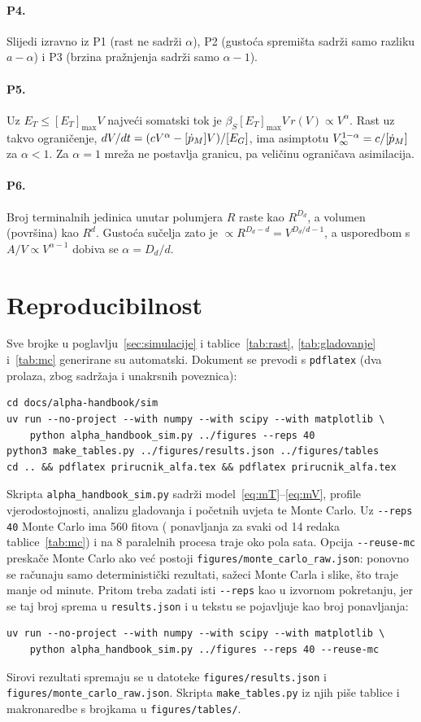 \paragraph{P4.} Slijedi izravno iz P1 (rast ne sadrži $\alpha$), P2 (gustoća spremišta sadrži samo razliku $a-\alpha$) i P3 (brzina pražnjenja sadrži samo $\alpha-1$).

\paragraph{P5.} Uz $E_T\le[E_T]_{\max}V$ najveći somatski tok je $\beta_S[E_T]_{\max}V\,r(V)\propto V^{\alpha}$. Rast uz takvo ograničenje, $dV/dt=(cV^{\alpha}-[\dot p_M] V)/[E_G]$, ima asimptotu $V_\infty^{1-\alpha}=c/[\dot p_M]$ za $\alpha<1$. Za $\alpha=1$ mreža ne postavlja granicu, pa veličinu ograničava asimilacija.

\paragraph{P6.} Broj terminalnih jedinica unutar polumjera $R$ raste kao $R^{D_d}$, a volumen (površina) kao $R^{d}$. Gustoća sučelja zato je $\propto R^{D_d-d}=V^{D_d/d-1}$, a usporedbom s $A/V\propto V^{\alpha-1}$ dobiva se $\alpha=D_d/d$.

\section{Reproducibilnost}\label{app:kod}

Sve brojke u poglavlju~\ref{sec:simulacije} i tablice~\ref{tab:rast}, \ref{tab:gladovanje} i~\ref{tab:mc} generirane su automatski. Dokument se prevodi s \texttt{pdflatex} (dva prolaza, zbog sadržaja i unakrsnih poveznica):
\begin{verbatim}
cd docs/alpha-handbook/sim
uv run --no-project --with numpy --with scipy --with matplotlib \
    python alpha_handbook_sim.py ../figures --reps 40
python3 make_tables.py ../figures/results.json ../figures/tables
cd .. && pdflatex prirucnik_alfa.tex && pdflatex prirucnik_alfa.tex
\end{verbatim}
Skripta \texttt{alpha\_handbook\_sim.py} sadrži model~\eqref{eq:mT}–\eqref{eq:mV}, profile vjerodostojnosti, analizu gladovanja i početnih uvjeta te Monte Carlo. Uz \texttt{-{}-reps 40} Monte Carlo ima 560 fitova (\MCreps{} ponavljanja za svaki od 14 redaka tablice~\ref{tab:mc}) i na 8 paralelnih procesa traje oko pola sata. Opcija \texttt{-{}-reuse-mc} preskače Monte Carlo ako već postoji \texttt{figures/monte\_carlo\_raw.json}: ponovno se računaju samo deterministički rezultati, sažeci Monte Carla i slike, što traje manje od minute. Pritom treba zadati isti \texttt{-{}-reps} kao u izvornom pokretanju, jer se taj broj sprema u \texttt{results.json} i u tekstu se pojavljuje kao broj ponavljanja:
\begin{verbatim}
uv run --no-project --with numpy --with scipy --with matplotlib \
    python alpha_handbook_sim.py ../figures --reps 40 --reuse-mc
\end{verbatim}
Sirovi rezultati spremaju se u datoteke \texttt{figures/results.json} i \texttt{figures/monte\_carlo\_raw.json}. Skripta \texttt{make\_tables.py} iz njih piše tablice i makronaredbe s brojkama u \texttt{figures/tables/}.
